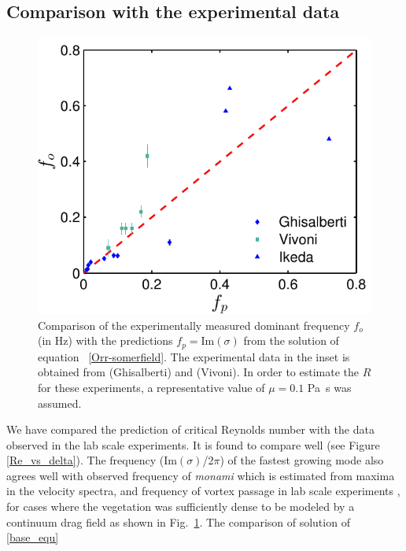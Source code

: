 \documentclass[12pt]{report}   %
\newcommand{\Rey}{{R}}
\newcommand{\monami}{\textit{monami}}
\begin{document}
\subsection{Comparison with the experimental data}
\begin{figure}
\centerline{\includegraphics[]{new_graph_freq}}
\caption[Comparison of the experimentally measured dominant frequency $f_o$ (in Hz) with the predictions $f_p=\text{Im}(\sigma)$ from the solution of equation ~\eqref{Orr-somerfield}]{Comparison of the experimentally measured dominant frequency $f_o$ (in Hz) with the predictions $f_p=\text{Im}(\sigma)$ from the solution of equation ~\eqref{Orr-somerfield}. 
The experimental data in the inset is obtained from \cite{Ghisal02} (Ghisalberti) and \cite{Vivoni98} (Vivoni). 
In order to estimate the $\Rey$ for these experiments, a representative value of $\mu=0.1$ Pa~s was assumed.
}
\label{frequency_comparison}
\end{figure}
We have compared the prediction of critical Reynolds number with the data observed in the lab scale experiments. It is found to compare well \cite{Ghisal02} (see Figure \ref{Re_vs_delta}). The frequency (Im$(\sigma)$/2$\pi$) of the fastest growing mode also agrees well with observed frequency of {\monami} which is estimated from maxima in the velocity spectra, and frequency of vortex passage in lab scale experiments \cite{Ghisal02}, for cases where the vegetation was sufficiently dense to be modeled by a continuum drag field as shown in Fig.~\ref{frequency_comparison}. The comparison of solution of \eqref{base_equ}
\end{document}
